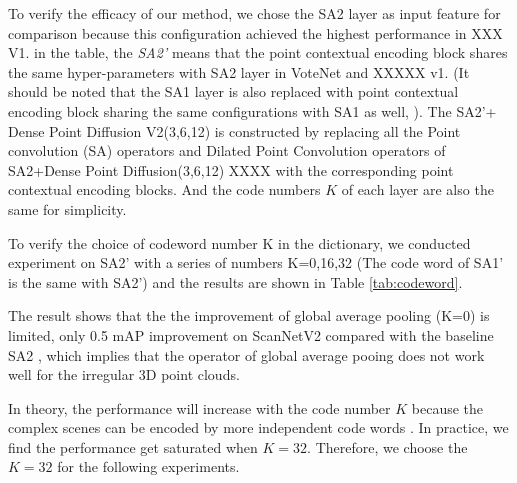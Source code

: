 \documentclass[runningheads]{llncs}
\begin{document}
To verify the efficacy of our method, we chose the  SA2 layer as input feature for comparison because this configuration achieved the highest performance in XXX V1. %
in the table, the \emph{SA2'} means that the point contextual encoding block shares the same hyper-parameters  with SA2 layer in VoteNet\cite{VoteNet} and XXXXX v1. (It should be noted that the SA1 layer is also replaced with point contextual encoding block sharing the same configurations with SA1 as well, ). The SA2'+ Dense Point Diffusion V2(3,6,12)  is constructed by replacing all the Point convolution (SA) operators and Dilated Point Convolution operators of SA2+Dense Point Diffusion(3,6,12) XXXX with the corresponding point contextual encoding blocks. And the code numbers $K$ of each layer are also the same for simplicity.










To verify the choice of codeword number K in the dictionary, we conducted experiment on SA2' with a series  of numbers K=0,16,32 (The code word of SA1' is the same with SA2') and the results are shown in Table \ref{tab:codeword}.       

The result shows that the the improvement of global average pooling (K=0) is limited, only 0.5 mAP improvement on ScanNetV2 compared with the baseline SA2 , which implies that the operator of global average pooing does not work well for the irregular 3D point clouds.


In theory,  the performance will increase with the code number $K$ because the  complex scenes can be encoded by more independent code words . In practice, we find the performance get saturated when $K=32$. Therefore, we choose the $K=32$ for the following experiments.
\end{document}
